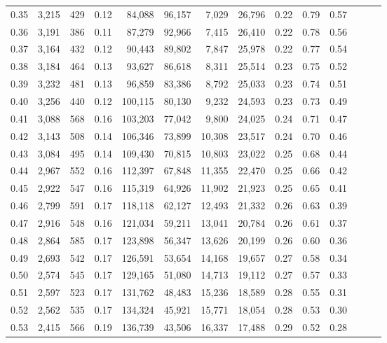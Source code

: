 \begin{tabular}{rrrrrrrrrrrrrr}
0.35 &  3,215 &  429 &  0.12 &   84,088 &   96,157 &   7,029 &  26,796 &  0.22 &  0.79 &      0.57 \\
0.36 &  3,191 &  386 &  0.11 &   87,279 &   92,966 &   7,415 &  26,410 &  0.22 &  0.78 &      0.56 \\
0.37 &  3,164 &  432 &  0.12 &   90,443 &   89,802 &   7,847 &  25,978 &  0.22 &  0.77 &      0.54 \\
0.38 &  3,184 &  464 &  0.13 &   93,627 &   86,618 &   8,311 &  25,514 &  0.23 &  0.75 &      0.52 \\
0.39 &  3,232 &  481 &  0.13 &   96,859 &   83,386 &   8,792 &  25,033 &  0.23 &  0.74 &      0.51 \\
0.40 &  3,256 &  440 &  0.12 &  100,115 &   80,130 &   9,232 &  24,593 &  0.23 &  0.73 &      0.49 \\
0.41 &  3,088 &  568 &  0.16 &  103,203 &   77,042 &   9,800 &  24,025 &  0.24 &  0.71 &      0.47 \\
0.42 &  3,143 &  508 &  0.14 &  106,346 &   73,899 &  10,308 &  23,517 &  0.24 &  0.70 &      0.46 \\
0.43 &  3,084 &  495 &  0.14 &  109,430 &   70,815 &  10,803 &  23,022 &  0.25 &  0.68 &      0.44 \\
0.44 &  2,967 &  552 &  0.16 &  112,397 &   67,848 &  11,355 &  22,470 &  0.25 &  0.66 &      0.42 \\
0.45 &  2,922 &  547 &  0.16 &  115,319 &   64,926 &  11,902 &  21,923 &  0.25 &  0.65 &      0.41 \\
0.46 &  2,799 &  591 &  0.17 &  118,118 &   62,127 &  12,493 &  21,332 &  0.26 &  0.63 &      0.39 \\
0.47 &  2,916 &  548 &  0.16 &  121,034 &   59,211 &  13,041 &  20,784 &  0.26 &  0.61 &      0.37 \\
0.48 &  2,864 &  585 &  0.17 &  123,898 &   56,347 &  13,626 &  20,199 &  0.26 &  0.60 &      0.36 \\
0.49 &  2,693 &  542 &  0.17 &  126,591 &   53,654 &  14,168 &  19,657 &  0.27 &  0.58 &      0.34 \\
0.50 &  2,574 &  545 &  0.17 &  129,165 &   51,080 &  14,713 &  19,112 &  0.27 &  0.57 &      0.33 \\
0.51 &  2,597 &  523 &  0.17 &  131,762 &   48,483 &  15,236 &  18,589 &  0.28 &  0.55 &      0.31 \\
0.52 &  2,562 &  535 &  0.17 &  134,324 &   45,921 &  15,771 &  18,054 &  0.28 &  0.53 &      0.30 \\
0.53 &  2,415 &  566 &  0.19 &  136,739 &   43,506 &  16,337 &  17,488 &  0.29 &  0.52 &      0.28 \\

\end{tabular}
